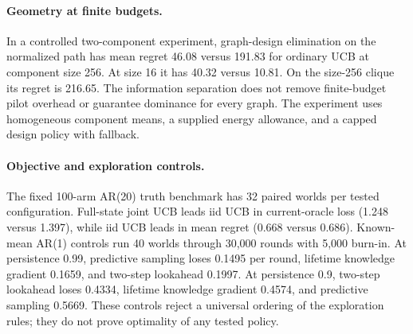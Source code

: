 \documentclass[sigconf,review,anonymous]{acmart}
\begin{document}
\paragraph{Geometry at finite budgets.} In a controlled two-component experiment, graph-design elimination on the normalized path has mean regret 46.08 versus 191.83 for ordinary UCB at component size 256. At size 16 it has 40.32 versus 10.81. On the size-256 clique its regret is 216.65. The information separation does not remove finite-budget pilot overhead or guarantee dominance for every graph. The experiment uses homogeneous component means, a supplied energy allowance, and a capped design policy with fallback.

\paragraph{Objective and exploration controls.} The fixed 100-arm AR(20) truth benchmark has 32 paired worlds per tested configuration. Full-state joint UCB leads iid UCB in current-oracle loss (1.248 versus 1.397), while iid UCB leads in mean regret (0.668 versus 0.686). Known-mean AR(1) controls run 40 worlds through 30,000 rounds with 5,000 burn-in. At persistence 0.99, predictive sampling loses 0.1495 per round, lifetime knowledge gradient 0.1659, and two-step lookahead 0.1997. At persistence 0.9, two-step lookahead loses 0.4334, lifetime knowledge gradient 0.4574, and predictive sampling 0.5669. These controls reject a universal ordering of the exploration rules; they do not prove optimality of any tested policy.
\end{document}
